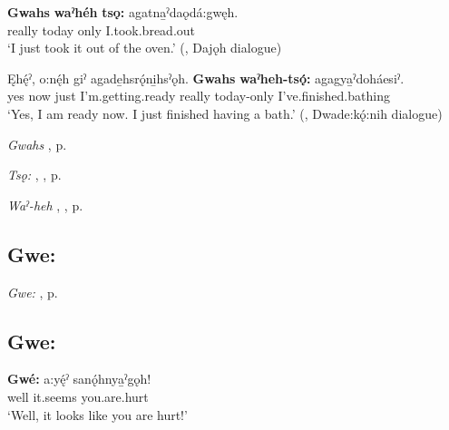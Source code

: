\ea
\label{ex:gpar112}
\gll \textbf{Gwahs} \textbf{waˀhéh} \textbf{tsǫ:} agatna̱ˀdaǫdá:gwęh.\\
really today only I.took.bread.out\\
\glt ‘I just took it out of the oven.’ (\cite[376]{mithun_watewayestanih_1984}, Dajǫh dialogue)
\z

\ea
\label{ex:gpar113}
\gll Ęhę́ˀ, o:nę́h giˀ agade̱hsrǫ́ni̱hsˀǫh. \textbf{Gwahs} \textbf{waˀheh-tsǫ́:} agagya̱ˀdoháesiˀ.\\
yes now just I’m.getting.ready really today-only I’ve.finished.bathing\\
\glt ‘Yes, I am ready now. I just finished having a bath.’ (\cite[294]{mithun_watewayestanih_1984}, Dwade:kǫ́:nih dialogue)
\z

\begin{CayugaRelated}
\item \textit{Gwahs} , p. \pageref{p:[gwahs] ‘anyway’}\\
\item \textit{Tsǫ:} , , p. \pageref{p:[tsǫ:]}\\
\item \textit{Waˀ-heh} , , p. \pageref{p:[waˀ-heh]}
\end{CayugaRelated}


\subsection*{\textbf{Gwe:} } \label{p:[gwe:] `hello!’}

\begin{CayugaRelated}
\item \textit{Gwe:} , p. \pageref{p:[gwe:] ‘well, …’}
\end{CayugaRelated}


\subsection*{\textbf{Gwe:} } \label{p:[gwe:] ‘well!’}

\ea
\label{ex:gpar114}
\gll \textbf{Gwé:} a:yę́ˀ sanǫ́hnya̱ˀgǫh!\\
well it.seems you.are.hurt\\
\glt ‘Well, it looks like you are hurt!’
\z

